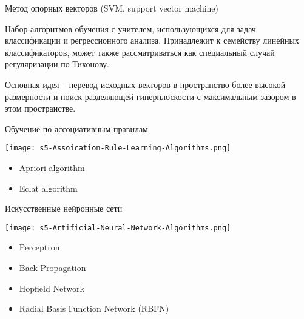 \documentclass[pdf, intlimits, 9pt, unicode]{beamer}
\begin{document}
\begin{frame}{Метод опорных векторов (SVM, support vector machine)}

\small

Набор алгоритмов обучения с учителем, использующихся для задач классификации и регрессионного анализа. \pause Принадлежит к семейству линейных классификаторов, может также рассматриваться как специальный случай регуляризации по Тихонову. \pause %

Основная идея -- {\color{red}перевод исходных векторов в пространство более высокой размерности} и поиск разделяющей {\color{red}гиперплоскости} с максимальным зазором в этом пространстве. \pause %
\end{frame}









\begin{frame}{Обучение по ассоциативным правилам}

\begin{center}\texttt{[image: s5-Assoication-Rule-Learning-Algorithms.png]}\end{center}

\begin{itemize}
\item Apriori algorithm
\item Eclat algorithm
\end{itemize}

\end{frame}





\begin{frame}{Искусственные нейронные сети}

\begin{center}\texttt{[image: s5-Artificial-Neural-Network-Algorithms.png]}\end{center}

\begin{itemize}
\item Perceptron
\item Back-Propagation
\item Hopfield Network
\item Radial Basis Function Network (RBFN)
\end{itemize}

\end{frame}
\end{document}
